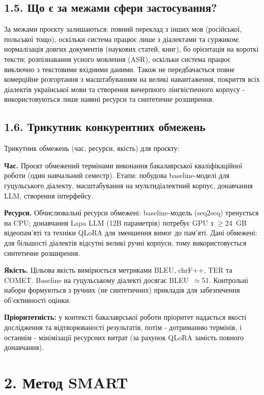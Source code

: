 \documentclass[14pt]{extarticle}
\begin{document}
\subsection*{1.5. Що є за межами сфери застосування?}

За межами проєкту залишаються: повний переклад з інших мов (російської, польської тощо), оскільки система працює лише з діалектами та суржиком; нормалізація довгих документів (наукових статей, книг), бо орієнтація на короткі тексти; розпізнавання усного мовлення (ASR), оскільки система працює виключно з текстовими вхідними даними. Також не передбачається повне комерційне розгортання з масштабуванням на великі навантаження, покриття всіх діалектів української мови та створення вичерпного лінгвістичного корпусу - використовуються лише наявні ресурси та синтетичне розширення.

\subsection*{1.6. Трикутник конкурентних обмежень}

Трикутник обмежень (час, ресурси, якість) для проєкту:

\textbf{Час.} Проєкт обмежений термінами виконання бакалаврської кваліфікаційної роботи (один навчальний семестр). Етапи: побудова baseline-моделі для гуцульського діалекту, масштабування на мультидіалектний корпус, донавчання LLM, створення інтерфейсу.

\textbf{Ресурси.} Обчислювальні ресурси обмежені: baseline-модель (seq2seq) тренується на CPU; донавчання Lapa LLM (12B параметрів) потребує GPU з $\geq$24~GB відеопам'яті та техніки QLoRA для зменшення вимог до пам'яті. Дані обмежені: для більшості діалектів відсутні великі ручні корпуси, тому використовується синтетичне розширення.

\textbf{Якість.} Цільова якість вимірюється метриками BLEU, chrF++, TER та COMET. Baseline на гуцульському діалекті досягає BLEU~$\approx$51. Контрольні набори формуються з ручних (не синтетичних) прикладів для забезпечення об'єктивності оцінки.

\textbf{Пріоритетність:} у контексті бакалаврської роботи пріоритет надається якості дослідження та відтворюваності результатів, потім - дотриманню термінів, і останнім - мінімізації ресурсних витрат (за рахунок QLoRA замість повного донавчання).

\section*{2. Метод SMART}
\end{document}
